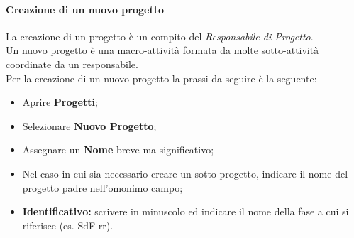         \paragraph{Creazione di un nuovo progetto}
          La creazione di un progetto è un compito del \emph{Responsabile di Progetto}.\\
          Un nuovo progetto è una macro-attività formata da molte sotto-attività coordinate da un responsabile.\\
          Per la creazione di un nuovo progetto la prassi da seguire è la seguente:
          \begin{itemize}
            \item Aprire \textbf{Progetti};
            \item Selezionare \textbf{Nuovo Progetto};
            \item Assegnare un \textbf{Nome} breve ma significativo;
            \item Nel caso in cui sia necessario creare un sotto-progetto, indicare il nome del progetto padre nell'omonimo campo;
            \item \textbf{Identificativo: }scrivere in minuscolo ed indicare il nome della fase a cui si riferisce (es. SdF-rr).
          \end{itemize}
